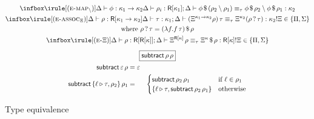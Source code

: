 \begin{figure}[t]
\begin{small}
\begin{gather*}
\\
\ib{\irule[\errule{map$_{\setminus}$}]
          {\KindJ \Delta {\phi} {\kappa_1 \to \kappa_2}}
          {\KindJ \Delta {\rho_i} {\RowK {\kappa_1}}};
          {\TEqvJ \Delta {\Mapp {\phi} {(\rho_2 \setminus \rho_1)}} {\Mapp \phi {\rho_2} \setminus {\Mapp \phi {\rho_1}}} {\kappa_2} }}          
\\
\begin{gathered}
\ib{\irule[\errule{assoc$_\Xi$}]
          {\KindJ \Delta \rho {\RowK {\kappa_1 \to \kappa_2}}}
          {\KindJ \Delta \tau \kappa_1};
          {\TEqvJ \Delta {(\KFam \Xi {\kappa_1 \to \kappa_2} \rho) \, \tau} {\KFam \Xi {\kappa_2} (\rho \, \Flap \, \tau)} {\kappa_2}}!
          {\Xi \in \Set {\Pi, \Sigma}}}
\\
\text {where $\rho \, \Flap \, \tau = \Mapp {(\lambda f. f \, \tau)} \rho$}
\end{gathered}          
\\
\ib{\irule[\errule{$\Xi$}]
          {\KindJ \Delta \rho {\RowK {\RowK {\kappa}}}};
          {\TEqvJ \Delta {\KFam \Xi {\RowK \kappa} \, \rho} {\Mapp {{\KFam \Xi \kappa}} \rho} {\RowK {\kappa}}}!
          {\Xi \in \{ \Pi , \Sigma \}}}
\\[5pt]
\fbox{$\Subtract \, \rho \, \rho$}
\\
\begin{aligned}
  \Subtract \, \EmptyRow \, \rho &= \EmptyRow \\
  \Subtract \, \Row {\LabTy \ell \tau, \rho_2} \, \rho_1 &= 
    &\begin{cases}
      \Subtract \, \rho_2 \, \rho_1 &\text{if $\ell \in \rho_{1}$} \\
      \Row {\LabTy \ell \tau, \Subtract \, \rho_2 \, \rho_1} &\text{otherwise}
    \end{cases}
\end{aligned}
\end{gather*}
\end{small}
\caption{Type equivalence}
\label{fig:equivalence}
\end{figure}